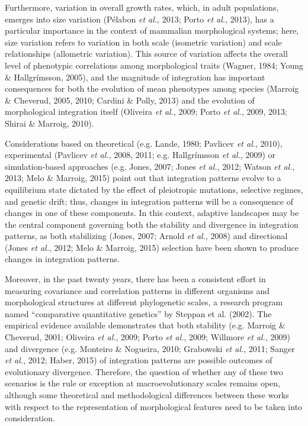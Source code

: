 \documentclass[11pt,twoside]{report}
\begin{document}
Furthermore, variation in overall growth rates, which, in adult
populations, emerges into size variation (Pélabon \emph{et al.}, 2013;
Porto \emph{et al.}, 2013), has a particular importance in the context
of mammalian morphological systems; here, size variation refers to
variation in both scale (isometric variation) and scale relationships
(allometric variation). This source of variation affects the overall
level of phenotypic correlations among morphological traits (Wagner,
1984; Young \& Hallgrímsson, 2005), and the magnitude of integration has
important consequences for both the evolution of mean phenotypes among
species (Marroig \& Cheverud, 2005, 2010; Cardini \& Polly, 2013) and
the evolution of morphological integration itself (Oliveira \emph{et
al.}, 2009; Porto \emph{et al.}, 2009, 2013; Shirai \& Marroig, 2010).

Considerations based on theoretical (e.g. Lande, 1980; Pavlicev \emph{et
al.}, 2010), experimental (Pavlicev \emph{et al.}, 2008, 2011; e.g.
Hallgrímsson \emph{et al.}, 2009) or simulation-based approaches (e.g.
Jones, 2007; Jones \emph{et al.}, 2012; Watson \emph{et al.}, 2013; Melo
\& Marroig, 2015) point out that integration patterns evolve to a
equilibrium state dictated by the effect of pleiotropic mutations,
selective regimes, and genetic drift; thus, changes in integration
patterns will be a consequence of changes in one of these components. In
this context, adaptive landscapes may be the central component governing
both the stability and divergence in integration patterns, as both
stabilizing (Jones, 2007; Arnold \emph{et al.}, 2008) and directional
(Jones \emph{et al.}, 2012; Melo \& Marroig, 2015) selection have been
shown to produce changes in integration patterns.

Moreover, in the past twenty years, there has been a consistent effort
in measuring covariance and correlation patterns in different organisms
and morphological structures at different phylogenetic scales, a
research program named ``comparative quantitative genetics'' by Steppan
et al. (2002). The empirical evidence available demonstrates that both
stability (e.g. Marroig \& Cheverud, 2001; Oliveira \emph{et al.}, 2009;
Porto \emph{et al.}, 2009; Willmore \emph{et al.}, 2009) and divergence
(e.g. Monteiro \& Nogueira, 2010; Grabowski \emph{et al.}, 2011; Sanger
\emph{et al.}, 2012; Haber, 2015) of integration patterns are possible
outcomes of evolutionary divergence. Therefore, the question of whether
any of these two scenarios is the rule or exception at macroevolutionary
scales remains open, although some theoretical and methodological
differences between these works with respect to the representation of
morphological features need to be taken into consideration.
\end{document}
